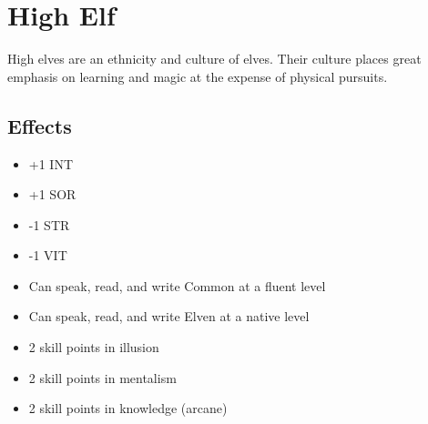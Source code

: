 \section{High Elf}\label{culture:high-elf}
High elves are an ethnicity and culture of elves. Their culture places great
emphasis on learning and magic at the expense of physical pursuits.

\subsection*{Effects}
\begin{itemize}
    \item +1 INT
    \item +1 SOR
    \item -1 STR
    \item -1 VIT
    \item Can speak, read, and write Common at a fluent level
    \item Can speak, read, and write Elven at a native level
    \item 2 skill points in illusion
    \item 2 skill points in mentalism
    \item 2 skill points in knowledge (arcane)
\end{itemize}
